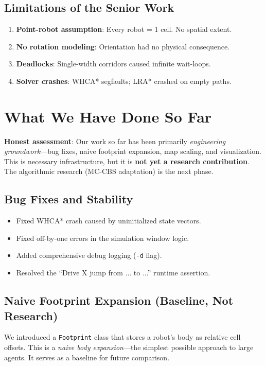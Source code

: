 \documentclass[12pt, a4paper]{article}
\begin{document}
\subsection{Limitations of the Senior Work}
\begin{enumerate}
    \item \textbf{Point-robot assumption}: Every robot = 1 cell. No spatial extent.
    \item \textbf{No rotation modeling}: Orientation had no physical consequence.
    \item \textbf{Deadlocks}: Single-width corridors caused infinite wait-loops.
    \item \textbf{Solver crashes}: WHCA* segfaults; LRA* crashed on empty paths.
\end{enumerate}

\section{What We Have Done So Far}
\label{sec:ours}

\textbf{Honest assessment}: Our work so far has been primarily \emph{engineering groundwork}---bug fixes, naive footprint expansion, map scaling, and visualization. This is necessary infrastructure, but it is \textbf{not yet a research contribution}. The algorithmic research (MC-CBS adaptation) is the next phase.

\subsection{Bug Fixes and Stability}
\begin{itemize}
    \item Fixed WHCA* crash caused by uninitialized state vectors.
    \item Fixed off-by-one errors in the simulation window logic.
    \item Added comprehensive debug logging (\texttt{-d} flag).
    \item Resolved the ``Drive X jump from ... to ...'' runtime assertion.
\end{itemize}

\subsection{Naive Footprint Expansion (Baseline, Not Research)}
We introduced a \texttt{Footprint} class that stores a robot's body as relative cell offsets. This is a \emph{naive body expansion}---the simplest possible approach to large agents. It serves as a baseline for future comparison.
\end{document}
